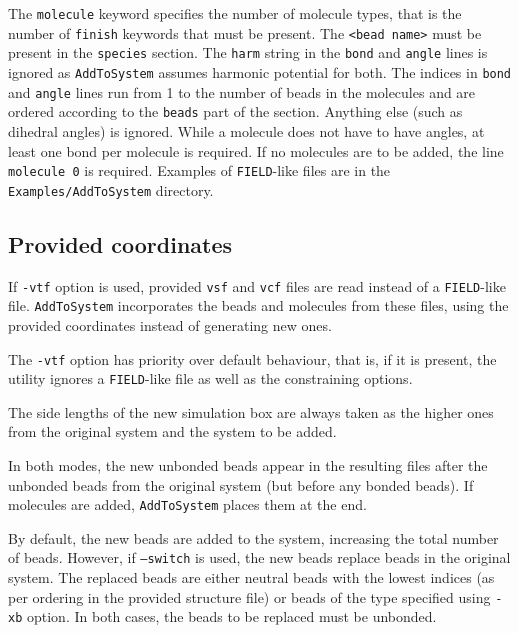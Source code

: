 The \texttt{molecule} keyword specifies the number of molecule types, that
is the number of \texttt{finish} keywords that must be present. The
\texttt{<bead name>} must be present in the \texttt{species} section. The
\texttt{harm} string in the \texttt{bond} and \texttt{angle} lines is
ignored as \texttt{AddToSystem} assumes harmonic potential for both. The
indices in \texttt{bond} and \texttt{angle} lines run from 1 to the number
of beads in the molecules and are ordered according to the \texttt{beads}
part of the section. Anything else (such as dihedral angles) is ignored.
While a molecule does not have to have angles, at least one bond per
molecule is required. If no molecules are to be added, the line
\texttt{molecule 0} is required. Examples of \texttt{FIELD}-like files are
in the \texttt{Examples/AddToSystem} directory.

\subsection{Provided coordinates} \label{ssec:vtf}

If \texttt{-vtf} option is used, provided \texttt{vsf} and \texttt{vcf}
files are read instead of a \texttt{FIELD}-like file. \texttt{AddToSystem}
incorporates the beads and molecules from these files, using the provided
coordinates instead of generating new ones.

The \texttt{-vtf} option has priority over default behaviour, that is, if
it is present, the utility ignores a \texttt{FIELD}-like file as well as
the constraining options.

The side lengths of the new simulation box are always taken as the higher
ones from the original system and the system to be added.

\vspace{1em}

In both modes, the new unbonded beads appear in the resulting files after
the unbonded beads from the original system (but before any bonded beads).
If molecules are added, \texttt{AddToSystem} places them at the end.

By default, the new beads are added to the system, increasing the total
number of beads. However, if \texttt{--switch} is used, the new beads
replace beads in the original system. The replaced beads are either neutral
beads with the lowest indices (as per ordering in the provided structure
file) or beads of the type specified using \texttt{-xb} option. In both
cases, the beads to be replaced must be unbonded.

